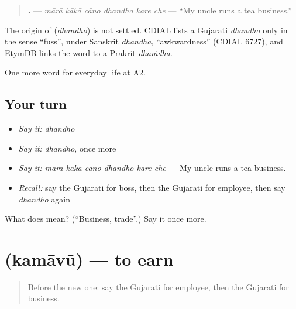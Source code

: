 \begin{quote}
\textbf{     .} — \emph{mārā kākā cāno dhandho kare che} — \textquotedblleft{}My uncle runs a tea business.\textquotedblright{}
\end{quote}

\begin{cousinweb}
The origin of \textbf{} (\emph{dhandho}) is not settled. CDIAL lists a Gujarati \emph{dhandho} only in the sense \textquotedblleft{}fuss\textquotedblright{}, under Sanskrit \emph{dhandha}, \textquotedblleft{}awkwardness\textquotedblright{} (CDIAL 6727), and EtymDB links the word to a Prakrit \emph{dhaṁdha}.
\end{cousinweb}

\begin{grammarlens}[title={What you've built}]
One more word for everyday life at A2.
\end{grammarlens}

\subsection*{Your turn}
\begin{itemize}
\raggedright
  \item \emph{Say it:} \emph{dhandho}
  \item \emph{Say it:} \emph{dhandho}, once more
  \item \emph{Say it:} \emph{mārā kākā cāno dhandho kare che} — My uncle runs a tea business.
  \item \emph{Recall:} say the Gujarati for boss, then the Gujarati for employee, then say \emph{dhandho} again
\end{itemize}

\begin{tcolorbox}[breakable,colback=teal!4,colframe=teal!35!black,title={Before you move on}]
What does  mean? (\textquotedblleft{}Business, trade\textquotedblright{}.) Say it once more.
\end{tcolorbox}
\section[\texorpdfstring{\gu{કમાવું} (kamāvũ)}{કમાવું (kamāvũ)}]{ (kamāvũ) — to earn}

\label{lesson:GU-C247-kamavu}



\begin{quote}
Before the new one: say the Gujarati for employee, then the Gujarati for business.
\end{quote}

